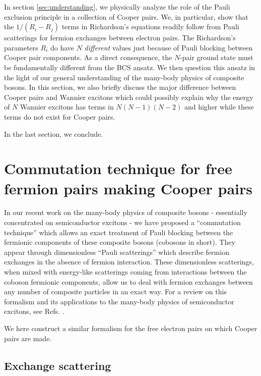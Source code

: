 \documentclass[epj]{svjour}
\begin{document}
In section \ref{sec:understanding},  we physically analyze the role of the Pauli exclusion principle in a collection of Cooper pairs. We, in particular, show that the $1/(R_i-R_j)$ terms in Richardson's equations readily follow
from Pauli scatterings for fermion exchanges 
between electron pairs. The Richardson's parameters $R_i$  do have $N$ \emph{different} values just because 
of Pauli blocking between Cooper pair components. As a direct consequence, the $N$-pair ground state must be fundamentally different from the BCS ansatz. We then question this ansatz in the light of our general understanding of the many-body physics of composite bosons. In this section, we also briefly discuss the major difference between Cooper pairs and Wannier excitons which could possibly explain why the energy of $N$ Wannier excitons has terms in $N(N-1)(N-2)$ and higher while these terms do not exist for Cooper pairs.

In the last section, we conclude.








\section{Commutation technique for free fermion pairs making Cooper pairs\label{sec:beta}}

In our recent work on the many-body physics of composite bosons - essentially concentrated on semiconductor excitons - we have
proposed a ``commutation technique'' which allows an exact treatment of Pauli blocking between the fermionic components of these composite
bosons (cobosons in short). They appear through dimensionless ``Pauli scatterings'' which describe fermion
exchanges in the absence of fermion interaction. These dimensionless
scatterings, when mixed with energy-like scatterings coming from interactions
between the coboson fermionic components, allow us to deal with fermion exchanges
between any number of composite particles in an exact way. For a review on
this formalism and its applications to the many-body physics of
semiconductor excitons, see Refs. \cite%
{CobosonPhysicsReports}.

We here construct a similar formalism for the free electron pairs on which Cooper pairs are made.


\subsection{Exchange scattering}
\end{document}

